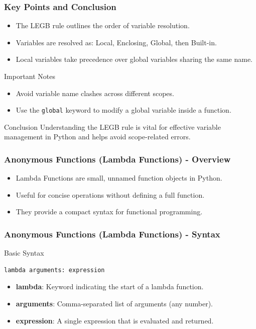 \documentclass{beamer}
\begin{document}
\begin{frame}
    \frametitle{Key Points and Conclusion}
    \begin{itemize}
        \item The LEGB rule outlines the order of variable resolution.
        \item Variables are resolved as: Local, Enclosing, Global, then Built-in.
        \item Local variables take precedence over global variables sharing the same name.
    \end{itemize}
    
    \begin{block}{Important Notes}
        \begin{itemize}
            \item Avoid variable name clashes across different scopes.
            \item Use the \texttt{global} keyword to modify a global variable inside a function.
        \end{itemize}
    \end{block}

    \begin{block}{Conclusion}
        Understanding the LEGB rule is vital for effective variable management in Python and helps avoid scope-related errors.
    \end{block}
\end{frame}

\begin{frame}
    \frametitle{Anonymous Functions (Lambda Functions) - Overview}
    \begin{itemize}
        \item Lambda Functions are small, unnamed function objects in Python.
        \item Useful for concise operations without defining a full function.
        \item They provide a compact syntax for functional programming.
    \end{itemize}
\end{frame}

\begin{frame}[fragile]
    \frametitle{Anonymous Functions (Lambda Functions) - Syntax}
    \begin{block}{Basic Syntax}
        \begin{lstlisting}
lambda arguments: expression
        \end{lstlisting}
    \end{block}
    \begin{itemize}
        \item \textbf{lambda}: Keyword indicating the start of a lambda function.
        \item \textbf{arguments}: Comma-separated list of arguments (any number).
        \item \textbf{expression}: A single expression that is evaluated and returned.
    \end{itemize}
\end{frame}
\end{document}
